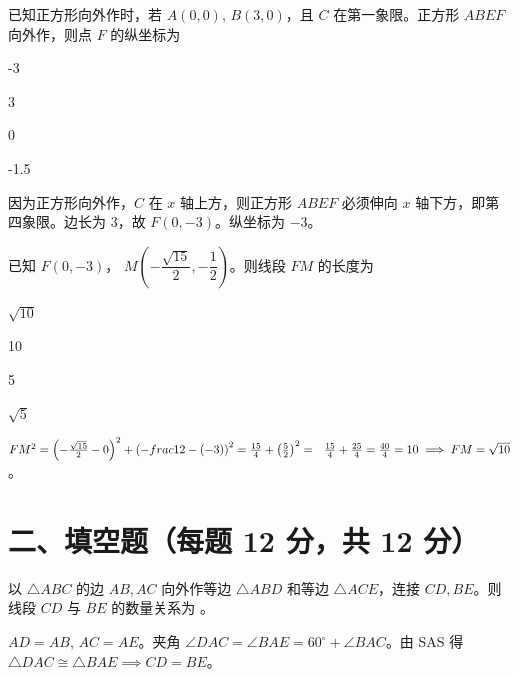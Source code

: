 \documentclass{exam-zh}
\begin{document}
\begin{question}[points=12]
  已知正方形向外作时，若 $A(0,0)$, $B(3,0)$，且 $C$ 在第一象限。正方形 $ABEF$ 向外作，则点 $F$ 的纵坐标为
  \begin{choices}
    \item -3
    \item 3
    \item 0
    \item -1.5
  \end{choices}
  \paren[A]
  \begin{solutionblock}
    因为正方形向外作，$C$ 在 $x$ 轴上方，则正方形 $ABEF$ 必须伸向 $x$ 轴下方，即第四象限。边长为 $3$，故 $F(0, -3)$。纵坐标为 $-3$。
  \end{solutionblock}
\end{question}



\begin{question}[points=12]
  已知 $F(0, -3)$， $M\left(-\dfrac{\sqrt{15}}{2}, -\dfrac{1}{2}\right)$。则线段 $FM$ 的长度为
  \begin{choices}
    \item $\sqrt{10}$
    \item 10
    \item 5
    \item $\sqrt{5}$
  \end{choices}
  \paren[A]
  \begin{solutionblock}
    $FM^2 = \left(-\frac{\sqrt{15}}{2} - 0\right)^2 + \left(-\\ frac{1}{2} - (-3)\right)^2 = \frac{15}{4} + \left(\frac{5}{2}\right)^2 =\ \ \frac{15}{4} + \frac{25}{4} = \frac{40}{4} = 10 \implies FM = \sqrt{10}$。
  \end{solutionblock}
\end{question}


\section*{二、填空题（每题 12 分，共 12 分）}


\begin{question}[points=12]
  以 $\triangle ABC$ 的边 $AB, AC$ 向外作等边 $\triangle ABD$ 和等边 $\triangle ACE$，连接 $CD, BE$。则线段 $CD$ 与 $BE$ 的数量关系为 \fillin。
  \paren[$CD = BE$]
  \begin{solutionblock}
    $AD = AB$, $AC = AE$。夹角 $\angle DAC = \angle BAE = 60^\circ + \angle BAC$。由 SAS 得 $\triangle DAC \cong \triangle BAE \implies CD = BE$。
  \end{solutionblock}
\end{question}
\end{document}
